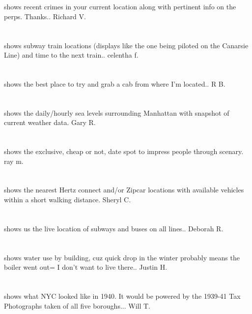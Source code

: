 \section{}shows recent crimes in your current location along with pertinent info on the perps.  Thanks.. Richard V.
\section{}shows subway train locations (displays like the one being piloted on the Canarsie Line) and time to the next train.. celentha f.
\section{}  shows the best place to try and grab a cab from where I'm located.. R B.
\section{}shows the daily/hourly sea levels surrounding Manhattan with snapshot of current weather data. Gary R.
\section{} shows the exclusive,  cheap or not,  date spot to impress people through scenary. ray m.
\section{}shows the nearest Hertz connect and/or Zipcar locations with available vehicles within a short walking distance.  Sheryl C.
\section{}shows us the live location of subways and buses on all lines.. Deborah R.
\section{}shows water use by building,  cuz quick drop in the winter probably means the boiler went out= I don't want to live there.. Justin H.
\section{}shows what NYC looked like in 1940.  It would be powered by the 1939-41 Tax Photographs taken of all five boroughs... Will T.

